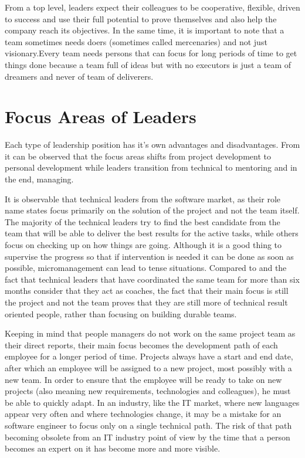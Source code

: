 From a top level, leaders expect their colleagues to be cooperative, flexible, driven to success and use their full potential to prove themselves and also help the company reach its objectives. In the same time, it is important to note that a team sometimes needs doers (sometimes called mercenaries) and not just visionary.Every team needs persons that can focus for long periods of time to get things done because a team full of ideas but with no executors is just a team of dreamers and never of team of deliverers.

\section{Focus Areas of Leaders}
\label{sec:focus}
Each type of leadership position has it's own advantages and disadvantages. From  it can be observed that the focus areas shifts from project development to personal development while leaders transition from technical to mentoring and in the end, managing.

It is observable that technical leaders from the software market, as their role name states focus primarily on the solution of the project and not the team itself. The majority of the technical leaders try to find the best candidate from the team that will be able to deliver the best results for the active tasks, while others focus on checking up on how things are going. Although it is a good thing to supervise the progress so that if intervention is needed it can be done as soon as possible, micromanagement can lead to tense situations. Compared to  and the fact that technical leaders that have coordinated the same team for more than six months consider that they act as coaches, the fact that their main focus is still the project and not the team proves that they are still more of technical result oriented people, rather than focusing on building durable teams.

Keeping in mind that people managers do not work on the same project team as their direct reports, their main focus becomes the development path of each employee for a longer period of time. Projects always have a start and end date, after which an employee will be assigned to a new project, most possibly with a new team. In order to ensure that the employee will be ready to take on new projects (also meaning new requirements, technologies and colleagues), he must be able to quickly adapt. In an industry, like the IT market,  where new languages appear very often and where technologies change, it may be a mistake for an software engineer to focus only on a single technical path. The risk of that path becoming obsolete from an IT industry  point of view by the time that a person becomes an expert on it has become more and more visible.

